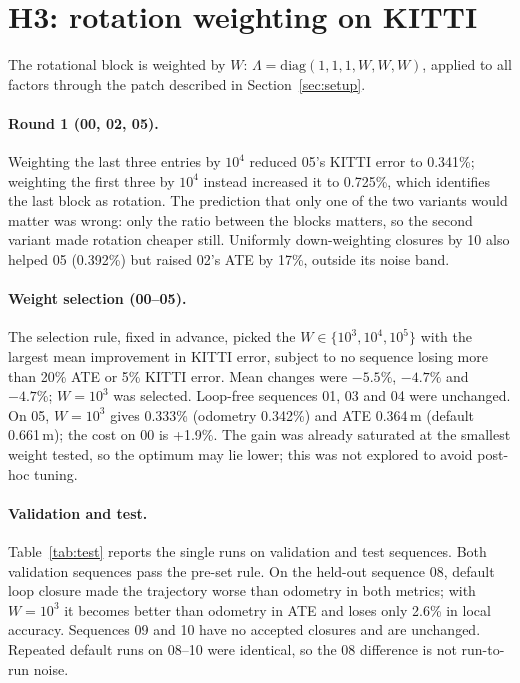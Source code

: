 \documentclass[11pt,a4paper]{article}
\begin{document}
\section{H3: rotation weighting on KITTI}
\label{sec:fix}
The rotational block is weighted by $W$: $\Lambda=\mathrm{diag}(1,1,1,W,W,W)$, applied to all factors through the
patch described in Section~\ref{sec:setup}.

\paragraph{Round 1 (00, 02, 05).} Weighting the last three entries by $10^4$ reduced 05's KITTI error to
0.341\%; weighting the first three by $10^4$ instead increased it to 0.725\%, which identifies the last block as
rotation. The prediction that only one of the two variants would matter was wrong: only the ratio between the
blocks matters, so the second variant made rotation cheaper still. Uniformly down-weighting closures by 10
also helped 05 (0.392\%) but raised 02's ATE by 17\%, outside its noise band.

\paragraph{Weight selection (00--05).} The selection rule, fixed in advance, picked the $W\in\{10^3,10^4,10^5\}$
with the largest mean improvement in KITTI error, subject to no sequence losing more than 20\% ATE or 5\% KITTI
error. Mean changes were $-5.5\%$, $-4.7\%$ and $-4.7\%$; $W=10^3$ was selected. Loop-free sequences 01, 03 and
04 were unchanged. On 05, $W=10^3$ gives 0.333\% (odometry 0.342\%) and ATE 0.364\,m (default 0.661\,m); the cost
on 00 is +1.9\%. The gain was already saturated at the smallest weight tested, so the optimum may lie lower;
this was not explored to avoid post-hoc tuning.

\paragraph{Validation and test.} Table~\ref{tab:test} reports the single runs on validation and test sequences.
Both validation sequences pass the pre-set rule. On the held-out sequence 08, default loop closure made the
trajectory worse than odometry in both metrics; with $W=10^3$ it becomes better than odometry in ATE and loses
only 2.6\% in local accuracy. Sequences 09 and 10 have no accepted closures and are unchanged. Repeated default
runs on 08--10 were identical, so the 08 difference is not run-to-run noise.
\end{document}
